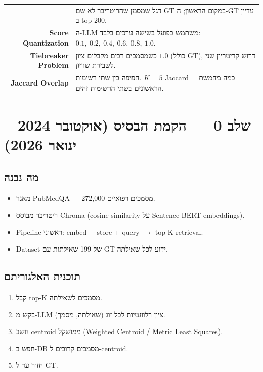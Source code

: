 \documentclass[12pt, a4paper]{article}
\begin{document}
\begin{table}[H]
\begin{tabular}{>{\bfseries}rp{10cm}}
  & דגל שמסמן שהריטריבר לא שם \textenglish{GT} במקום הראשון; ה-\textenglish{GT} עדיין ב-\textenglish{top-200}. \\[4pt]
\textenglish{Score Quantization}
  & ה-\textenglish{LLM} משתמש בפועל בשישה ערכים בלבד: $0.1,\ 0.2,\ 0.4,\ 0.6,\ 0.8,\ 1.0$. \\[4pt]
\textenglish{Tiebreaker Problem}
  & כשמסמכים רבים מקבלים ציון $1.0$ (כולל \textenglish{GT}), דרוש קריטריון שני לשבירת שוויון. \\[4pt]
\textenglish{Jaccard Overlap}
  & חפיפה בין שתי רשימות. $K{=}5$ \textenglish{Jaccard} = כמה מחמשת הראשונים בשתי הרשימות זהים. \\
\bottomrule
\end{tabular}
\end{table}

\section{שלב 0 --- הקמת הבסיס (אוקטובר 2024 -- ינואר 2026)}

\subsection{מה נבנה}
\begin{itemize}
  \item מאגר \textenglish{PubMedQA} --- 272{,}000 מסמכים רפואיים.
  \item ריטריבר מבוסס \textenglish{Chroma} (\textenglish{cosine similarity} על \textenglish{Sentence-BERT embeddings}).
  \item \textenglish{Pipeline} ראשוני: \textenglish{embed + store + query} $\to$ \textenglish{top-K retrieval}.
  \item \textenglish{Dataset} של 199 שאילתות עם \textenglish{GT} ידוע לכל שאילתה.
\end{itemize}

\subsection{תוכנית האלגוריתם}
\begin{enumerate}
  \item קבל \textenglish{top-K} מסמכים לשאילתה.
  \item בקש מ-\textenglish{LLM} ציון רלוונטיות לכל זוג (שאילתה, מסמך).
  \item חשב \textenglish{centroid} ממושקל (\textenglish{Weighted Centroid / Metric Least Squares}).
  \item חפש ב-\textenglish{DB} מסמכים קרובים ל-\textenglish{centroid}.
  \item חזור עד ל-\textenglish{GT}.
\end{enumerate}
\end{document}
